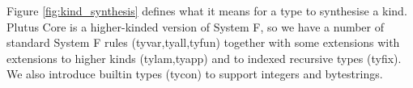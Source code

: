 \documentclass[a4paper]{article}
\newcommand{\judgmentdef}[2]{\fbox{#1}

\vspace{0.5em}

#2}
\newcommand{\ctxni}[2]{#1 \ni #2}
\newcommand{\termJ}[2]{#1 : #2}
\newcommand{\typeJ}[2]{#1 :: #2}
\begin{document}
\begin{figure}[H]
{%
%
%
%
%
%
%


}
    \label{fig:contexts}
\end{figure}

\newpage
\noindent Figure \ref{fig:kind_synthesis} defines what
it means for a type to synthesise a kind. Plutus Core is a
higher-kinded version of System F, so we have a number of standard
System F rules (tyvar,tyall,tyfun) together with some extensions with
extensions to higher kinds (tylam,tyapp) and to indexed
recursive types (tyfix). We also introduce builtin types (tycon) to
support integers and bytestrings.

\end{document}
